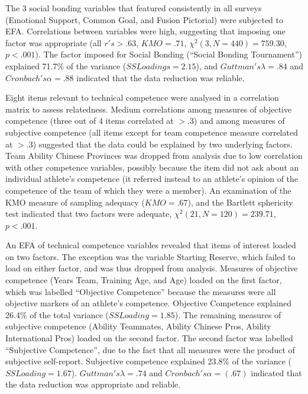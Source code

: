 \begin{CJK}{UTF8}{gbsn}
The 3 social bonding variables that featured consistently in all surveys (Emotional Support, Common Goal, and Fusion Pictorial) were subjected to EFA.  Correlations between variables were high, suggesting that imposing one factor was appropriate (all $r's > .63$, $KMO = .71$, $\chi^2(3, N = 440) =  759.30$, $p < .001$).  The factor imposed for Social Bonding (``Social Bonding Tournament'') explained 71.7\% of the variance ($SS Loadings =  2.15$), and $Guttman's \lambda =.84$ and $Cronbach's \alpha= .88$ indicated that the data reduction was reliable.


Eight items relevant to technical competence were analysed in a correlation matrix to assess relatedness.  Medium correlations among measures of objective competence (three out of 4 items correlated at $> .3$) and among measures of subjective competence (all items except for team competence measure correlated at $> .3$) suggested that the data could be explained by two underlying factors. Team Ability Chinese Provinces was dropped from analysis due to low correlation with other competence variables, possibly because the item did not ask about an individual athlete's competence (it referred instead to an athlete's opinion of the competence of the team of which they were a member). An examination of the KMO measure of sampling adequacy ($KMO = .67$), and the Bartlett sphericity test indicated that two factors were adequate, $\chi^2(21, N = 120) = 239.71$, $p < .001$.

An EFA of technical competence variables revealed that items of interest loaded on two factors. The exception was the variable Starting Reserve, which failed to load on either factor, and was thus dropped from analysis. Measures of objective competence (Years Team, Training Age, and Age) loaded on the first factor, which was labelled ``Objective Competence'' because the measures were all objective markers of an athlete's competence.  Objective Competence explained 26.4\% of the total variance ($SS Loading = 1.85$). The remaining measures of subjective competence (Ability Teammates, Ability Chinese Pros, Ability International Pros) loaded on the second factor.  The second factor was labelled ``Subjective Competence'', due to the fact that all measures were the product of subjective self-report.  Subjective competence explained 23.8\% of the variance ($SS Loading = 1.67$). $Guttman's \lambda =.74$ and $Cronbach's \alpha = (.67)$ indicated that the data reduction was appropriate and reliable.


\end{CJK}
